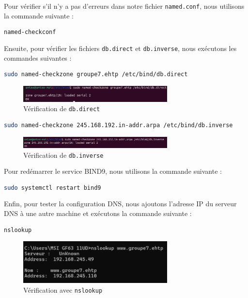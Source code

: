 	Pour vérifier s’il n’y a pas d’erreurs dans notre fichier \texttt{named.conf}, nous utilisons la commande suivante :
	\begin{lstlisting}[language=bash]
	named-checkconf
	\end{lstlisting}

	Ensuite, pour vérifier les fichiers \texttt{db.direct} et \texttt{db.inverse}, nous exécutons les commandes suivantes :
	
	\begin{lstlisting}[language=bash]
	sudo named-checkzone groupe7.ehtp /etc/bind/db.direct
	\end{lstlisting}
	
	\begin{figure}[h]
		\centering
		\includegraphics[width=0.7\textwidth]{DNS/checkzone_direct.png}
		\caption{Vérification de \texttt{db.direct}}
		\label{fig:ridal}
	\end{figure}

	\begin{lstlisting}[language=bash]
	sudo named-checkzone 245.168.192.in-addr.arpa /etc/bind/db.inverse
	\end{lstlisting}

	\begin{figure}[h]
		\centering
		\includegraphics[width=0.7\textwidth]{DNS/checkzone_inverse.png}
		\caption{Vérification de \texttt{db.inverse}}
		\label{fig:ridal}
	\end{figure}

	Pour redémarrer le service BIND9, nous utilisons la commande suivante :
	
	\begin{lstlisting}[language=bash]
	sudo systemctl restart bind9
	\end{lstlisting}

	Enfin, pour tester la configuration DNS, nous ajoutons l’adresse IP du serveur DNS à une autre machine et exécutons la commande suivante :
	
	\begin{lstlisting}[language=bash]
	nslookup
	\end{lstlisting}
	
	\begin{figure}[h]
		\centering
		\includegraphics[width=0.7\textwidth]{DNS/test1.png}
		\caption{Vérification avec \texttt{nslookup}}
		\label{fig:ridal}
	\end{figure}

